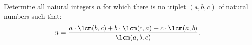 Determine all natural integers $n$ for which there is no triplet $(a,b,c)$ of natural numbers such that:
$$n=\frac{a\cdot\lcm(b,c)+b\cdot\lcm(c,a)+c\cdot\lcm(a,b)}{\lcm(a,b,c)}.$$
